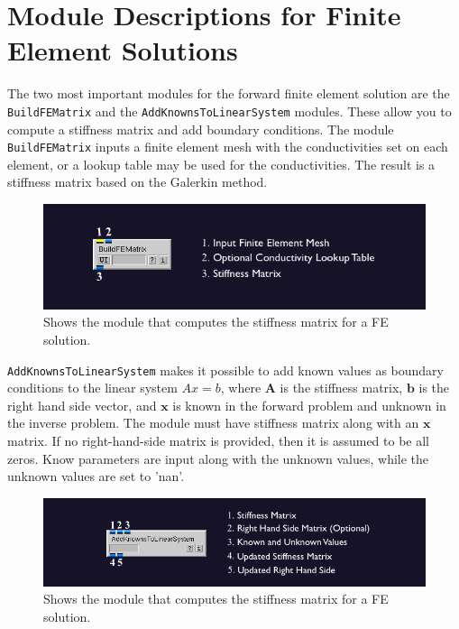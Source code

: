 \documentclass[fleqn,11pt,openany]{book}
\begin{document}
\section{Module Descriptions for Finite Element Solutions}

The two most important modules for the forward finite element solution are the {\tt BuildFEMatrix}
and the {\tt AddKnownsToLinearSystem} modules. These allow you to compute a stiffness matrix and add boundary conditions. The module {\tt BuildFEMatrix} inputs a finite element mesh with the conductivities set on each element, or a lookup table may be used for the conductivities. The result is a stiffness matrix based on the Galerkin method.

\begin{figure}[H]
\begin{center}
\includegraphics[width=\textwidth]{ECGToolkitGuide_figures/FEMmod.png}
\caption{Shows the module that computes the stiffness matrix for a FE solution.}
\label{FEM}
\end{center}
\end{figure}

{\tt AddKnownsToLinearSystem} makes it possible to add known values as boundary conditions
to the linear system $Ax=b$, where $\mathbf{A}$ is the stiffness matrix, $\mathbf{b}$ is the right hand side vector, and
$\mathbf{x}$ is known in the forward problem and unknown in the inverse problem. The module must have stiffness matrix along with an $\mathbf{x}$ matrix. If no right-hand-side matrix is provided, then it is assumed to be all zeros. Know parameters are input along with the unknown values, while the unknown
values are set to 'nan'.

\begin{figure}[H]
\begin{center}
\includegraphics[width=\textwidth]{ECGToolkitGuide_figures/AddKnowns.png}
\caption{Shows the module that computes the stiffness matrix for a FE solution.}
\label{AddKnowns}
\end{center}
\end{figure}
\end{document}
